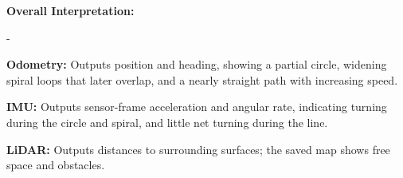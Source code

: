 \documentclass[11pt,twoside,letterpaper]{article}
\date{October 19, 2026}
\begin{document}

\setcounter{page}{1}
\pagestyle{fancy}



\medskip
\textbf{Overall Interpretation:}
\begin{list}{-}{\setlength{\leftmargin}{1em}\setlength{\labelwidth}{0.6em}\setlength{\labelsep}{0.4em}\setlength{\topsep}{2pt}\setlength{\partopsep}{0pt}\setlength{\itemsep}{1pt}\setlength{\parsep}{0pt}}
\item \textbf{Odometry:} Outputs position and heading, showing a partial circle, widening spiral loops that later overlap, and a nearly straight path with increasing speed.
\item \textbf{IMU:} Outputs sensor-frame acceleration and angular rate, indicating turning during the circle and spiral, and little net turning during the line.
\item \textbf{LiDAR:} Outputs distances to surrounding surfaces; the saved map shows free space and obstacles.
\end{list}
\end{document}
